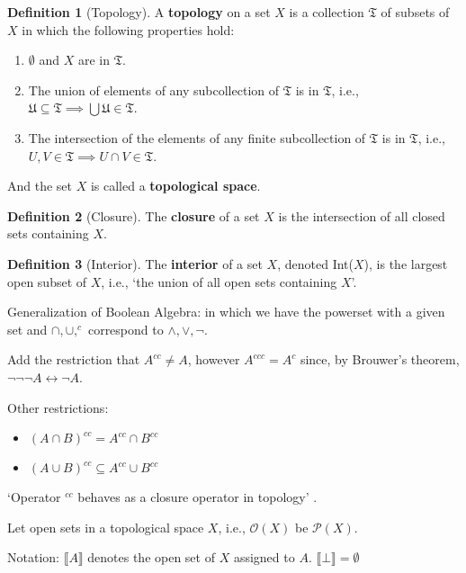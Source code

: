 \documentclass[12pt,a4paper]{article}
\theoremstyle{definition}
\newtheorem{definition}{Definition}[section]
\begin{document}
\begin{definition}[Topology]
    A \textbf{topology} on a set $X$ is a collection $\mathfrak{T}$ of subsets of $X$ in which the following properties hold:
    \begin{enumerate}
        \item $\emptyset$ and $X$ are in $\mathfrak{T}$.
        \item The union of elements of any subcollection of $\mathfrak{T}$ is in $\mathfrak{T}$, i.e., $\mathfrak{U} \subseteq \mathfrak{T} \implies \bigcup \mathfrak{U} \in \mathfrak{T}$.
        \item The intersection of the elements of any finite subcollection of $\mathfrak{T}$ is in $\mathfrak{T}$, i.e., $U, V \in \mathfrak{T} \implies U \cap V \in \mathfrak{T}$.
    \end{enumerate}
    And the set $X$ is called a \textbf{topological space}.
\end{definition}

\begin{definition}[Closure]
    The \textbf{closure} of a set $X$ is the intersection of all closed sets containing $X$.
\end{definition}

\begin{definition}[Interior]
    The \textbf{interior} of a set $X$, denoted Int($X$), is the largest open subset of $X$, i.e., `the union of all open sets containing $X$'.
\end{definition}

Generalization of Boolean Algebra: in which we have the powerset with a given set and $\cap, \cup, ^c$ correspond to $\land, \lor, \neg$.

Add the restriction that $A^{cc} \neq A$, however $A^{ccc} = A^c$ since, by Brouwer's theorem, $\neg \neg \neg A \leftrightarrow \neg A$.

Other restrictions:
\begin{itemize}
    \item $(A \cap B)^{cc} = A^{cc} \cap B^{cc}$
    \item $(A \cup B)^{cc} \subseteq A^{cc} \cup B^{cc}$
\end{itemize}

`Operator $^{cc}$ behaves as a closure operator in topology' \cite{vandalen-blackwell}.

Let open sets in a topological space $X$, i.e., $\mathcal{O}(X)$ be $\mathcal{P}(X)$.

Notation: $\llbracket A \rrbracket$ denotes the open set of $X$ assigned to $A$. $\llbracket \bot \rrbracket = \emptyset$
\end{document}
